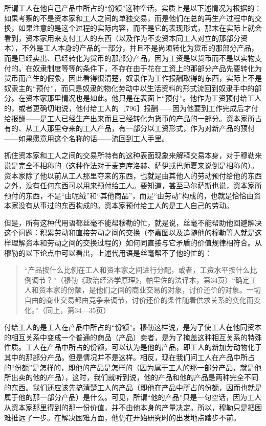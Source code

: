所谓工人在他自己产品中所占的“份额”这种空话，实质上是以下述情况为根据的：如果考察的不是资本家和工人之间的单独交易，而是他们在总的再生产过程中的交换，如果注意的是这个过程的实际内容，而不是它的表现形式，那末在实际上就会看到，资本家用来支付工人的东西（以及作为不变资本同工人对立的那部分资本），不外是工人本身的产品的一部分，并且不是尚须转化为货币的那部分产品，而是已经卖出、已经转化为货币的那部分产品，因为工资是以货币而不是以实物支付的。在奴隶制度等等的条件下，不存在由于花在工资上的那部分产品先要转化为货币而产生的假象，因此看得很清楚，奴隶作为工作报酬取得的东西，实际上不是奴隶主的“预付”，而只是奴隶的物化劳动中以生活资料的形式流回到奴隶手中的部分。在资本家那里情况也是如此。他只是在表面上“预付”。他作为工资预付给工人的，或者更确切地说，他付给工人的［796］报酬——因为他要到工作完成后才付给报酬——是工人已经生产出来而且已经转化为货币的产品的一部分。资本家所占有的、从工人那里夺来的工人产品，有一部分以工资形式，作为对新产品的预付——如果愿意用这个名称的话——流回到工人手里。

抓住资本家和工人之间的交易所特有的这种表面现象来解释交易本身，对于穆勒来说是完全不相称的（这种作法对于麦克库洛赫、萨伊或巴师夏来说倒是相称的）。资本家除了他以前从工人那里夺来的东西，也就是由其他人的劳动预付给他的东西之外，没有任何东西可以用来预付给工人。要知道，甚至马尔萨斯也说，资本家所预付的东西，不是“由呢绒”和“其他商品”，而是“由劳动”构成的，也就是恰恰由资本家没有从事过的东西构成的。资本家预付给工人的是工人自己的劳动。

但是，所有这种代用语都丝毫不能帮穆勒的忙，就是说，丝毫不能帮助他回避解决这个问题：积累劳动和直接劳动之间的交换（李嘉图以及追随他的穆勒等人就是这样理解资本和劳动之间的交换过程的）如何同直接与它矛盾的价值规律相符合。从穆勒的以下论点中可以看出，上述代用语是丝毫帮不了他的忙的：

\begin{quote}{“产品按什么比例在工人和资本家之间进行分配，或者，工资水平按什么比例调节？”（穆勒《政治经济学原理》，帕里佐的法译本，第34页）“确定工人和资本家的份额，是他们之间的商业交易的对象，讨价还价的对象。一切自由的商业交易都由竞争来调节，讨价还价的条件随着供求关系的变化而变化。”（同上，第34—35页）}\end{quote}

付给工人的是工人在产品中所占的“份额”。穆勒这样说，是为了使工人在他同资本的相互关系中变成一个普通的商品（产品）卖者，是为了掩盖这种相互关系的特殊性质。工人在产品中所占的份额，可以认为是他的产品，即工人的新加劳动物化于其中的那部分产品。但是情况并不是这样。相反，现在我们问工人在产品中所占的“份额”是怎样的，即他的产品是怎样的（因为属于工人的那一部分产品，就是他所出卖的他的产品），这时，我们就听到说，他的产品和他的产品是两种完全不同的东西。我们还应该先搞清楚工人的产品（即他在产品中所占的份额，因而也就是属于他的那一部分产品）是什么。可见，所谓“他的产品”只是一句空话，因为工人从资本家那里得到的那一份价值，并不由他本身的产量决定。所以，穆勒只是把困难推远了一步。在解决困难方面，他仍在开始研究时的出发地点踏步不前。

